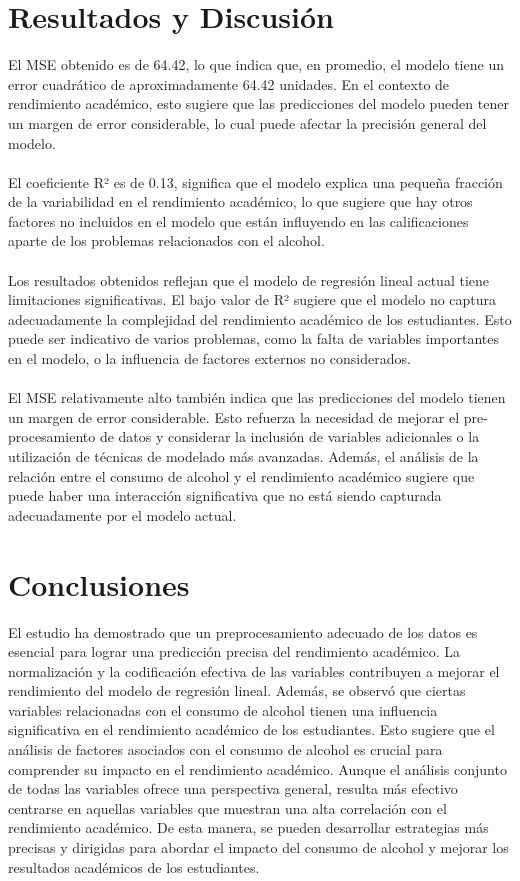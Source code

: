 \documentclass[a4paper,12pt]{article}
\begin{document}
\section{Resultados y Discusión}
El MSE obtenido es de 64.42, lo que indica que, en promedio, el modelo tiene un error cuadrático de aproximadamente 64.42 unidades. En el contexto de rendimiento académico, esto sugiere que las predicciones del modelo pueden tener un margen de error considerable, lo cual puede afectar la precisión general del modelo. \\
\\
El coeficiente R² es de 0.13, significa que el modelo explica una pequeña fracción de la variabilidad en el rendimiento académico, lo que sugiere que hay otros factores no incluidos en el modelo que están influyendo en las calificaciones aparte de los problemas relacionados con el alcohol. \\
\\
Los resultados obtenidos reflejan que el modelo de regresión lineal actual tiene limitaciones significativas. El bajo valor de R² sugiere que el modelo no captura adecuadamente la complejidad del rendimiento académico de los estudiantes. Esto puede ser indicativo de varios problemas, como la falta de variables importantes en el modelo, o la influencia de factores externos no considerados. \\
\\
El MSE relativamente alto también indica que las predicciones del modelo tienen un margen de error considerable. Esto refuerza la necesidad de mejorar el pre-procesamiento de datos y considerar la inclusión de variables adicionales o la utilización de técnicas de modelado más avanzadas. Además, el análisis de la relación entre el consumo de alcohol y el rendimiento académico sugiere que puede haber una interacción significativa que no está siendo capturada adecuadamente por el modelo actual.


\section{Conclusiones}
El estudio ha demostrado que un preprocesamiento adecuado de los datos es esencial para lograr una predicción precisa del rendimiento académico. La normalización y la codificación efectiva de las variables contribuyen a mejorar el rendimiento del modelo de regresión lineal. Además, se observó que ciertas variables relacionadas con el consumo de alcohol tienen una influencia significativa en el rendimiento académico de los estudiantes. Esto sugiere que el análisis de factores asociados con el consumo de alcohol es crucial para comprender su impacto en el rendimiento académico. Aunque el análisis conjunto de todas las variables ofrece una perspectiva general, resulta más efectivo centrarse en aquellas variables que muestran una alta correlación con el rendimiento académico. De esta manera, se pueden desarrollar estrategias más precisas y dirigidas para abordar el impacto del consumo de alcohol y mejorar los resultados académicos de los estudiantes.
\end{document}

